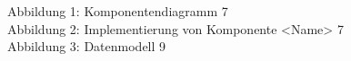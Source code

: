







\tableofcontents                          %
\listoffigures                            %

Abbildung 1: Komponentendiagramm                                         7\\
Abbildung 2: Implementierung von Komponente <Name>                       7\\
Abbildung 3: Datenmodell                                                 9\\



